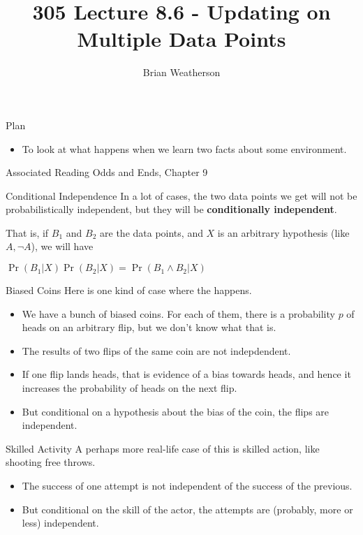 \documentclass[
  ignorenonframetext,
]{beamer}
\title{305 Lecture 8.6 - Updating on Multiple Data Points}
\author{Brian Weatherson}
\date{}
\providecommand{\tightlist}{%
  \setlength{\itemsep}{0pt}\setlength{\parskip}{0pt}}
\renewcommand{\,}{\text{, }}
\renewenvironment*{quote}	
	{\list{}{\rightmargin   \leftmargin} \item } 	
	{\endlist }
\begin{document}
\frame{\titlepage}

\begin{frame}{Plan}
\protect\hypertarget{plan}{}
\begin{itemize}
\tightlist
\item
  To look at what happens when we learn two facts about some
  environment.
\end{itemize}
\end{frame}

\begin{frame}{Associated Reading}
\protect\hypertarget{associated-reading}{}
Odds and Ends, Chapter 9
\end{frame}

\begin{frame}{Conditional Independence}
\protect\hypertarget{conditional-independence}{}
In a lot of cases, the two data points we get will not be
probabilistically independent, but they will be \textbf{conditionally
independent}.

That is, if \(B_1\) and \(B_2\) are the data points, and \(X\) is an
arbitrary hypothesis (like \(A, \neg A\)), we will have

\begin{quote}
\(\Pr(B_1 | X)\Pr(B_2 | X) = \Pr(B_1 \wedge B_2 | X)\)
\end{quote}
\end{frame}

\begin{frame}{Biased Coins}
\protect\hypertarget{biased-coins}{}
Here is one kind of case where the happens.

\begin{itemize}
\tightlist
\item
  We have a bunch of biased coins. For each of them, there is a
  probability \(p\) of heads on an arbitrary flip, but we don't know
  what that is. \pause
\item
  The results of two flips of the same coin are not indepdendent.
\item
  If one flip lands heads, that is evidence of a bias towards heads, and
  hence it increases the probability of heads on the next flip. \pause
\item
  But conditional on a hypothesis about the bias of the coin, the flips
  are independent.
\end{itemize}
\end{frame}

\begin{frame}{Skilled Activity}
\protect\hypertarget{skilled-activity}{}
A perhaps more real-life case of this is skilled action, like shooting
free throws.

\begin{itemize}
\tightlist
\item
  The success of one attempt is not independent of the success of the
  previous.
\item
  But conditional on the skill of the actor, the attempts are (probably,
  more or less) independent.
\end{itemize}
\end{frame}
\end{document}
